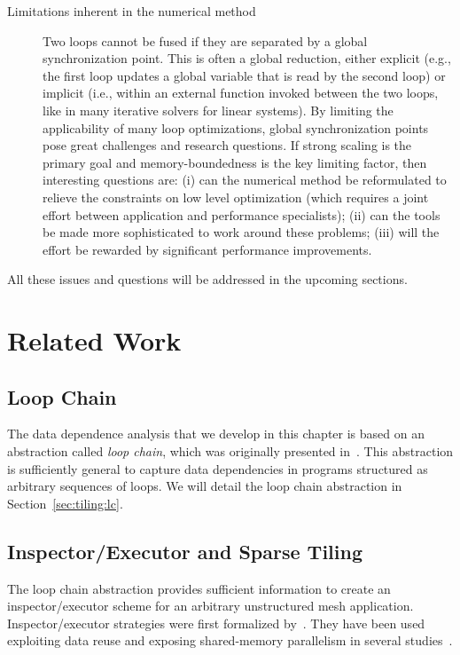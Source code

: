 \begin{description}
\item[Limitations inherent in the numerical method] Two loops cannot be fused if they are separated by a global synchronization point. This is often a global reduction, either explicit (e.g., the first loop updates a global variable that is read by the second loop) or implicit (i.e., within an external function invoked between the two loops, like in many iterative solvers for linear systems). By limiting the applicability of many loop optimizations, global synchronization points pose great challenges and research questions. If strong scaling is the primary goal and memory-boundedness is the key limiting factor, then interesting questions are: (i) can the numerical method be reformulated to relieve the constraints on low level optimization (which requires a joint effort between application and performance specialists); (ii) can the tools be made more sophisticated to work around these problems; (iii) will the effort be rewarded by significant performance improvements.
\end{description}

All these issues and questions will be addressed in the upcoming sections.

\section{Related Work}
\label{sec:tiling:relatedwork}

\subsection*{Loop Chain}
The data dependence analysis that we develop in this chapter is based on an abstraction called \textit{loop chain}, which was originally presented in~\cite{ST-KriegerHIPS2013}. This abstraction is sufficiently general to capture data dependencies in programs structured as arbitrary sequences of loops. We will detail the loop chain abstraction in Section~\ref{sec:tiling:lc}.

\subsection*{Inspector/Executor and Sparse Tiling}
The loop chain abstraction provides sufficient information to create an inspector/executor scheme for an arbitrary unstructured mesh application. Inspector/executor strategies were first formalized by~\cite{ST-Saltz91}. They have been used exploiting data reuse and exposing shared-memory parallelism in several studies~\citep{ST-dimeEtna00,ST-StroutLCPC2002,ST-Demmel08,ST-KriegerIAAA2012}. 

